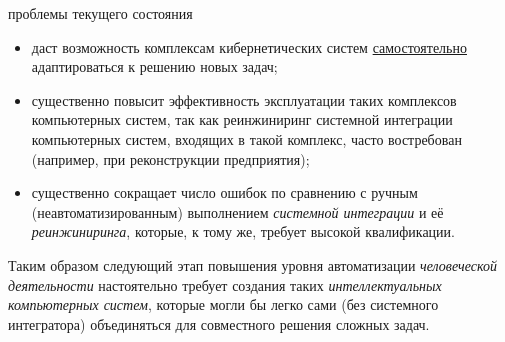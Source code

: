 \begin{scnsubstruct}
\begin{scnrelfromset}{проблемы текущего состояния}
{            \begin{itemize}
                \item даст возможность комплексам кибернетических систем \uline{самостоятельно} адаптироваться к решению новых задач;
                \item существенно повысит эффективность эксплуатации таких комплексов компьютерных систем, так как реинжиниринг системной интеграции компьютерных систем, входящих в такой комплекс, часто востребован (например, при реконструкции предприятия);
                \item существенно сокращает число ошибок по сравнению с ручным (неавтоматизированным) выполнением \textit{системной интеграции} и её \textit{реинжиниринга}, которые, к тому же, требует высокой квалификации.
            \end{itemize}
            Таким образом следующий этап повышения уровня автоматизации \textit{человеческой деятельности} настоятельно требует создания таких \textit{интеллектуальных компьютерных систем}, которые могли бы легко сами (без системного интегратора) объединяться для совместного решения сложных задач.}
    \end{scnrelfromset}
    

\end{scnsubstruct}
